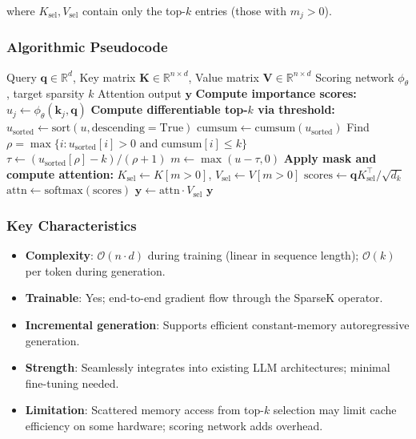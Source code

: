 \documentclass[11pt,a4paper]{article}
\begin{document}
where $K_{\text{sel}}, V_{\text{sel}}$ contain only the top-$k$ entries (those with $m_j > 0$).

\subsubsection{Algorithmic Pseudocode}

\begin{algorithm}[H]
\caption{SparseK: Differentiable Top-$k$ Attention}
\begin{algorithmic}[1]
\Require Query $\mathbf{q} \in \mathbb{R}^d$, Key matrix $\mathbf{K} \in \mathbb{R}^{n \times d}$, Value matrix $\mathbf{V} \in \mathbb{R}^{n \times d}$
\Require Scoring network $\phi_\theta$, target sparsity $k$
\Ensure Attention output $\mathbf{y}$
\State \textbf{Compute importance scores:}
    \State $u_j \gets \phi_\theta(\mathbf{k}_j, \mathbf{q})$
\EndFor
\State \textbf{Compute differentiable top-$k$ via threshold:}
\State $u_{\text{sorted}} \gets \text{sort}(u, \text{descending}=\text{True})$
\State $\text{cumsum} \gets \text{cumsum}(u_{\text{sorted}})$
\State Find $\rho = \max\{i : u_{\text{sorted}}[i] > 0 \text{ and cumsum}[i] \leq k\}$
\State $\tau \gets (u_{\text{sorted}}[\rho] - k) / (\rho + 1)$ 
\State $m \gets \max(u - \tau, 0)$ 
\State \textbf{Apply mask and compute attention:}
\State $K_{\text{sel}} \gets K[m > 0]$, $V_{\text{sel}} \gets V[m > 0]$
\State $\text{scores} \gets \mathbf{q} K_{\text{sel}}^\top / \sqrt{d_k}$
\State $\text{attn} \gets \text{softmax}(\text{scores})$
\State $\mathbf{y} \gets \text{attn} \cdot V_{\text{sel}}$
\Return $\mathbf{y}$
\end{algorithmic}
\end{algorithm}

\subsubsection{Key Characteristics}

\begin{itemize}[leftmargin=*]
    \item \textbf{Complexity}: $\mathcal{O}(n \cdot d)$ during training (linear in sequence length); $\mathcal{O}(k)$ per token during generation.
    \item \textbf{Trainable}: Yes; end-to-end gradient flow through the SparseK operator.
    \item \textbf{Incremental generation}: Supports efficient constant-memory autoregressive generation.
    \item \textbf{Strength}: Seamlessly integrates into existing LLM architectures; minimal fine-tuning needed.
    \item \textbf{Limitation}: Scattered memory access from top-$k$ selection may limit cache efficiency on some hardware; scoring network adds overhead.
\end{itemize}
\end{document}
